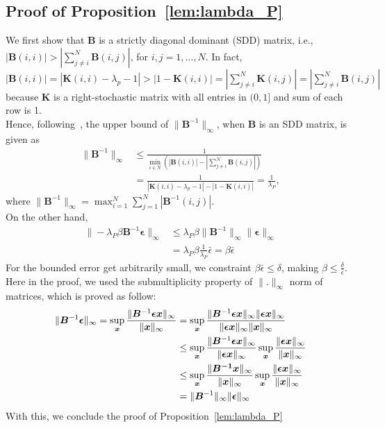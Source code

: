 \subsection{Proof of Proposition~\ref{lem:lambda_P}}
\label{secapp:lambda_P}
We first show that $\bm{B}$ is a strictly diagonal dominant (SDD) matrix, i.e., $|\bm{B}(i, i)| > |\sum_{j \neq i}^N\bm{B}(i, j)|$, for $i, j = 1, \dots, N$. In fact, $|\bm{B}(i, i)| = |\bm{K}(i, i) - \lambda_p - 1| > |1 - \bm{K}(i, i)| = |\sum_{j \neq i}^N\bm{K}(i, j)| = |\sum_{j \neq i}^N\bm{B}(i, j)|$ because $\bm{K}$ is a right-stochastic matrix with all entries in $(0, 1]$ and sum of each row is 1.
\\
Hence, following~\cite{MORACA2007666}, the upper bound of $\| \bm{B}^{-1}\|_{\infty}$, when $\bm{B}$ is an SDD matrix, is given as
\begin{align}
    \| \bm{B}^{-1}\|_{\infty} &\leq \frac{1}{ \displaystyle \min_{i \in N}(|\bm{B}(i, i)| - |\sum_{j \neq i}^N\bm{B}(i, j)|)} \\
    & = \frac{1}{|\bm{K}(i, i) - \lambda_p - 1| - |1 - \bm{K}(i, i)|} = \frac{1}{\lambda_P},
\end{align} where $\displaystyle \| \bm{B}^{-1}\|_{\infty} = \max_{i = 1}^N \sum_{j = 1}^N |\bm{B}^{-1}(i, j)|$.\\
On the other hand, 
\begin{equation}
    \begin{aligned}
    \|-\lambda_P\beta \bm{B}^{-1}\bm{\epsilon}\|_{\infty} &\leq \lambda_P\beta \| \bm{B}^{-1}\|_{\infty}\| \bm{\epsilon}\|_{\infty} \\
    &= \lambda_P \beta \frac{1}{\lambda_P} \bar{\epsilon}
    =\beta\bar{\epsilon}
    \end{aligned}
\end{equation}
For the bounded error get arbitrarily small, we constraint $\beta\bar{\epsilon} \leq \delta$, making $\beta \leq \frac{\delta}{\bar{\epsilon}}$.\\
Here in the proof, we used the submultiplicity property of $\|.\|_{\infty}$ norm of matrices, which is proved as follow:
\begin{equation}
    \begin{aligned}
        \nonumber
        \| \bm{B}^{-1}\bm{\epsilon}\|_{\infty} = \sup_{{\bm x}}\frac{\|\bm{B}^{-1}\bm{\epsilon} {\bm x}\|_{\infty}}{\| {\bm x}\|_{\infty}} &= \sup_{{\bm x}}\frac{\|\bm{B}^{-1}\bm{\epsilon} {\bm x}\|_{\infty} \|\bm{\epsilon} {\bm x}\|_{\infty}}{\|\bm{\epsilon} {\bm x}\|_{\infty}\| {\bm x}\|_{\infty}}\\
        &\leq \sup_{{\bm x}}\frac{\|\bm{B}^{-1}\bm{\epsilon} {\bm x}\|_{\infty}}{\| \bm{\epsilon} {\bm x}\|_{\infty}} \sup_{{\bm x}}\frac{\|\bm{\epsilon} {\bm x}\|_{\infty}}{\| {\bm x}\|_{\infty}}\\
        & \leq \sup_{{\bm x}}\frac{\|\bm{ B^{-1}} {\bm x}\|_{\infty}}{\| {\bm x}\|_{\infty}}\sup_{{\bm x}}\frac{\|\bm{\epsilon} {\bm x}\|_{\infty}}{\| {\bm x}\|_{\infty}}\\
        &= \|\bm{B}^{-1}\|_{\infty}\|\bm{\epsilon}\|_{\infty}
    \end{aligned}
\end{equation}
With this, we conclude the proof of Proposition~\ref{lem:lambda_P}
